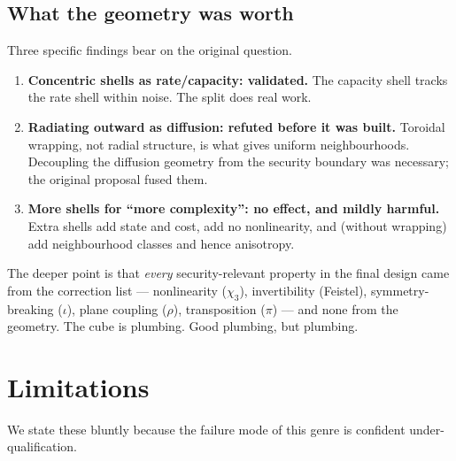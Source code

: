 \documentclass[11pt,a4paper]{article}
\theoremstyle{plain}
\theoremstyle{definition}
\theoremstyle{remark}
\begin{document}
\subsection{What the geometry was worth}

Three specific findings bear on the original question.

\begin{enumerate}
  \item \textbf{Concentric shells as rate/capacity: validated.} The capacity shell
    tracks the rate shell within noise. The split does real work.
  \item \textbf{Radiating outward as diffusion: refuted before it was built.} Toroidal
    wrapping, not radial structure, is what gives uniform neighbourhoods. Decoupling
    the diffusion geometry from the security boundary was necessary; the original
    proposal fused them.
  \item \textbf{More shells for ``more complexity'': no effect, and mildly harmful.}
    Extra shells add state and cost, add no nonlinearity, and (without wrapping) add
    neighbourhood classes and hence anisotropy.
\end{enumerate}

The deeper point is that \emph{every} security-relevant property in the final design
came from the correction list --- nonlinearity ($\chi_3$), invertibility (Feistel),
symmetry-breaking ($\iota$), plane coupling ($\rho$), transposition ($\pi$) --- and
none from the geometry. The cube is plumbing. Good plumbing, but plumbing.

\section{Limitations}
\label{sec:limitations}

We state these bluntly because the failure mode of this genre is confident
under-qualification.
\end{document}

